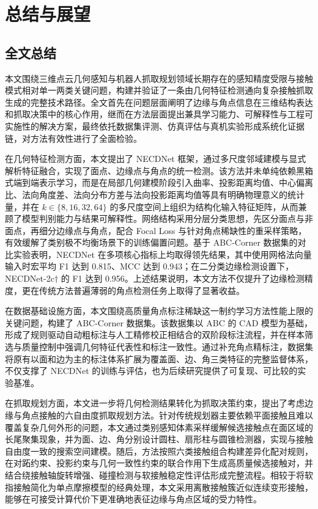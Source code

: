 \chapter{总结与展望}

\section{全文总结}

本文围绕三维点云几何感知与机器人抓取规划领域长期存在的感知精度受限与接触模式相对单一两类关键问题，构建并验证了一条由几何特征检测通向复杂接触抓取生成的完整技术路径。全文首先在问题层面阐明了边缘与角点信息在三维结构表达和抓取决策中的核心作用，继而在方法层面提出兼具学习能力、可解释性与工程可实施性的解决方案，最终依托数据集评测、仿真评估与真机实验形成系统化证据链，对方法有效性进行了全面检验。

在几何特征检测方面，本文提出了 NECDNet 框架，通过多尺度邻域建模与显式解析特征融合，实现了面点、边缘点与角点的统一检测。该方法并未单纯依赖黑箱式端到端表示学习，而是在局部几何建模阶段引入曲率、投影距离均值、中心偏离比、法向角度差、法向分布方差与法向投影距离均值等具有明确物理意义的统计量，并在 $k\in\{8,16,32,64\}$ 的多尺度空间上组织为结构化输入特征矩阵，从而兼顾了模型判别能力与结果可解释性。网络结构采用分层分类思想，先区分面点与非面点，再细分边缘点与角点，配合 Focal Loss 与针对角点稀缺性的重采样策略，有效缓解了类别极不均衡场景下的训练偏置问题。基于 ABC-Corner 数据集的对比实验表明，NECDNet 在多项核心指标上均取得领先结果，其中使用网格法向量输入时宏平均 F1 达到 0.815、MCC 达到 0.943；在二分类边缘检测设置下，NECDNet-2c$\dagger$ 的 F1 达到 0.956。上述结果说明，本文方法不仅提升了边缘检测精度，更在传统方法普遍薄弱的角点检测任务上取得了显著收益。

在数据基础设施方面，本文围绕高质量角点标注稀缺这一制约学习方法性能上限的关键问题，构建了 ABC-Corner 数据集。该数据集以 ABC 的 CAD 模型为基础，形成了规则驱动自动粗标注与人工精修校正相结合的双阶段标注流程，并在样本筛选与质量控制中强调几何特征代表性和标注一致性。通过补充角点精标注，数据集将原有以面和边为主的标注体系扩展为覆盖面、边、角三类特征的完整监督体系，不仅支撑了 NECDNet 的训练与评估，也为后续研究提供了可复现、可比较的实验基准。

在抓取规划方面，本文进一步将几何检测结果转化为抓取决策约束，提出了考虑边缘与角点接触的六自由度抓取规划方法。针对传统规划器主要依赖平面接触且难以覆盖复杂几何外形的问题，本文通过类别感知体素采样缓解候选接触点在面区域的长尾聚集现象，并为面、边、角分别设计圆柱、扇形柱与圆锥检测器，实现与接触自由度一致的搜索空间建模。随后，方法按照六类接触组合构建差异化配对规则，在对跖约束、投影约束与几何一致性约束的联合作用下生成高质量候选接触对，并结合绕接触轴旋转增强、碰撞检测与软接触稳定性评估形成完整流程。相较于将软指接触简化为单点摩擦模型的经典处理，本文采用离散接触簇近似连续变形接触，能够在可接受计算代价下更准确地表征边缘与角点区域的受力特性。


